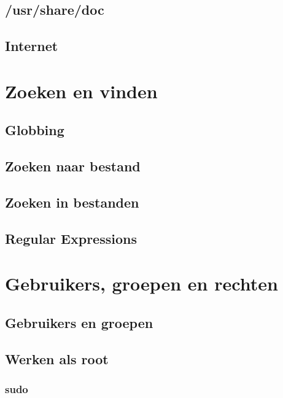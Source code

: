 \documentclass[a4paper,12pt,twoside,openright,titlepage]{book}
\begin{document}
\section{/usr/share/doc}

\section{Internet}


\chapter{Zoeken en vinden}\label{zoekenenvinden}

\section{Globbing}

\section{Zoeken naar bestand}


\section{Zoeken in bestanden}
\section{Regular Expressions}

\chapter{Gebruikers, groepen en rechten}

\section{Gebruikers en groepen}


\section{Werken als root}

\subsection{sudo}

\end{document}
